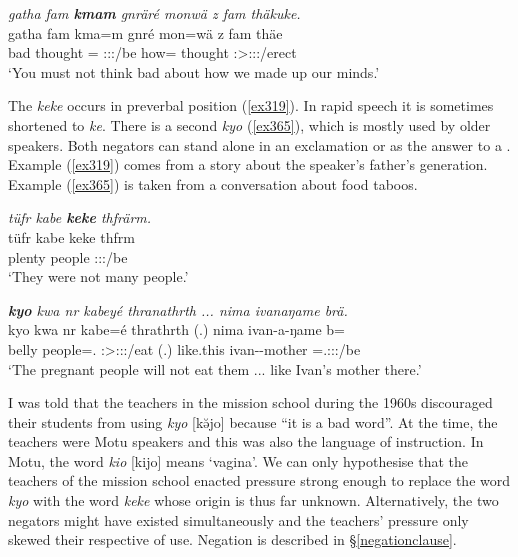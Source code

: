 \begin{exe}
	\ex \emph{gatha fam \textbf{kmam} gnräré monwä z fam thäkuke.}\\
	\gll gatha fam kma=m gnré mon=wä z fam thäe\\
	bad thought {\Pot}={\Appr} \Ssg:\Sbj:\Imp:\Ipfv/be how={\Emph} {\Iam} thought \Fpl:\Sbj>\Stpl:\Obj:\Rpst:\Pfv/erect\\
	\trans `You must not think bad about how we made up our minds.' 
	\label{ex111}
\end{exe}

The  \emph{keke} occurs in preverbal position (\ref{ex319}). In rapid speech it is sometimes shortened to \emph{ke}. There is a second  \emph{kyo} (\ref{ex365}), which is mostly used by older speakers. Both negators can stand alone in an exclamation or as the answer to a . Example (\ref{ex319}) comes from a story about the speaker's father's generation. Example (\ref{ex365}) is taken from a conversation about food taboos.

\begin{exe}
	\ex \emph{tüfr kabe \textbf{keke} thfrärm.}\\
	\gll tüfr kabe keke thfrm\\
	plenty people {\Neg} \Stpl:\Sbj:\Pst:\Dur/be\\
	\trans `They were not many people.' 
	\label{ex319}
\end{exe}
\begin{exe}
	\ex \emph{\textbf{kyo} kwa nr kabeyé thranathrth ... nima ivanaŋame brä.}\\
	\gll kyo kwa nr kabe=é thrathrth (.) nima ivan-a-ŋame b=\\
	{\Neg} {\Fut} belly people=\Erg.{\Nsg} \Stpl:\Sbj>\Stpl:\Obj:\Irr:\Ipfv/eat (.) like.this ivan-\Poss-mother \Med=\Tsg.\F:\Sbj:\Nonpast:\Ipfv/be\\
	\trans `The pregnant people will not eat them ... like Ivan's mother there.'\\ 
	\label{ex365}
\end{exe}

I was told that the teachers in the mission school during the 1960s discouraged their students from using \emph{kyo} [kə̆jo] because ``it is a bad word''. At the time, the teachers were Motu speakers and this was also the language of instruction. In Motu, the word \emph{kio} [kijo] means `vagina'. We can only hypothesise that the teachers of the mission school enacted pressure strong enough to replace the word \emph{kyo} with the word \emph{keke} whose origin is thus far unknown. Alternatively, the two negators might have existed simultaneously and the teachers' pressure only skewed their respective  of use. Negation is described in \S\ref{negationclause}.

